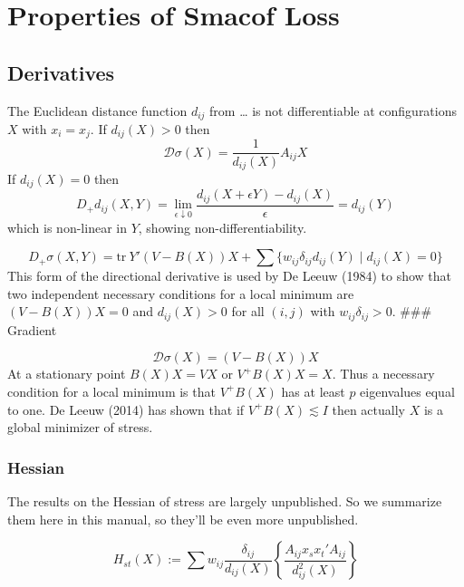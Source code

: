 \documentclass[
  12pt,
]{article}
\begin{document}
\section{Properties of Smacof Loss}\label{properties-of-smacof-loss}

\subsection{Derivatives}\label{derivatives}

The Euclidean distance function \(d_{ij}\) from \ldots{} is not differentiable
at configurations \(X\) with \(x_i=x_j\). If \(d_{ij}(X)>0\) then \[
\mathcal{D}\sigma(X)=\frac{1}{d_{ij}(X)}A_{ij}X
\] If \(d_{ij}(X)=0\) then \[
D_+d_{ij}(X,Y)=\lim_{\epsilon\downarrow 0}\frac{d_{ij}(X+\epsilon Y)-d_{ij}(X)}{\epsilon}=d_{ij}(Y)
\] which is non-linear in \(Y\), showing non-differentiability.

\[
D_+\sigma(X,Y)=\text{tr}\ Y'(V-B(X))X+\sum\{w_{ij}\delta_{ij}d_{ij}(Y)\mid d_{ij}(X)=0\}
\] This form of the directional derivative is used by De Leeuw (1984) to
show that two independent necessary conditions for a local minimum are
\((V-B(X))X=0\) and \(d_{ij}(X)>0\) for all \((i,j)\) with
\(w_{ij}\delta_{ij}>0\). \#\#\# Gradient

\[
\mathcal{D}\sigma(X)=(V-B(X))X
\] At a stationary point \(B(X)X=VX\) or \(V^+B(X)X=X\). Thus a necessary
condition for a local minimum is that \(V^+B(X)\) has at least \(p\)
eigenvalues equal to one. De Leeuw (2014) has shown that if
\(V^+B(X)\lesssim I\) then actually \(X\) is a global minimizer of stress.

\subsubsection{Hessian}\label{hessian}

The results on the Hessian of stress are largely unpublished. So we
summarize them here in this manual, so they'll be even more unpublished.

\[
H_{st}(X):=\sum w_{ij}\frac{\delta_{ij}}{d_{ij}(X)}\left\{\frac{A_{ij}x_sx_t'A_{ij}}{d_{ij}^2(X)}\right\}
\]
\end{document}
